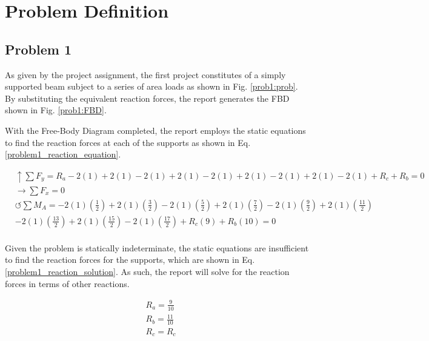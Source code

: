 \documentclass[a4paper]{article}
\begin{document}
\section{Problem Definition} \label{Problems}
\subsection{Problem 1}

As given by the project assignment, the first project constitutes of a simply supported beam subject to a series of area loads as shown in Fig. \ref{prob1:prob}. By substituting the equivalent reaction forces, the report generates the FBD shown in Fig. \ref{prob1:FBD}.


With the Free-Body Diagram completed, the report employs the static equations to find the reaction forces at each of the supports as shown in Eq. \ref{problem1_reaction_equation}.

\begin{equation}
\begin{split}
	&\uparrow \sum F_y = R_a - 2(1) + 2(1) - 2(1) + 2(1) - 2(1) + 2(1) - 2(1) + 2(1) - 2(1) + R_c + R_b = 0 \\
 	&\rightarrow \sum F_x = 0 \\
 	&\circlearrowleft \sum M_A = -2(1)\left(\frac{1}{2}\right) + 2(1)\left(\frac{3}{2}\right) - 2(1)\left(\frac{5}{2}\right) + 2(1)\left(\frac{7}{2}\right) - 2(1)\left(\frac{9}{2}\right) + 2(1)\left(\frac{11}{2}\right) \\ 
	& - 2(1)\left(\frac{13}{2}\right) + 2(1)\left(\frac{15}{2}\right) - 2(1)\left(\frac{17}{2}\right)  + R_c(9) + R_b(10) = 0 \\
\end{split}
\label{problem1_reaction_equation}
\end{equation}

Given the problem is statically indeterminate, the static equations are insufficient to find the reaction forces for the supports, which are shown in Eq. \ref{problem1_reaction_solution}. As such, the report will solve for the reaction forces in terms of other reactions.

\begin{equation}
\begin{split}
	& R_a = \frac{9}{10} \\
	& R_b = \frac{11}{10} \\
	& R_c = R_c \\
\end{split}
\label{problem1_reaction_solution}
\end{equation}
\end{document}

